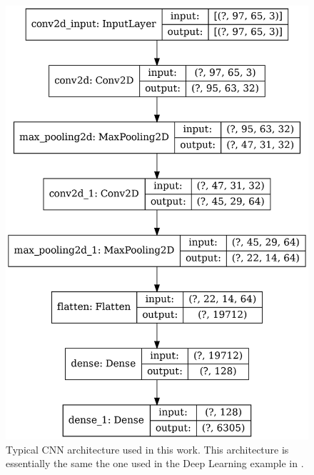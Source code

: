 \documentclass[12pt]{article}
\begin{document}
\begin{figure}[h] 
   \centering
    \includegraphics[totalheight=9cm]{Figures/typical_cnn.png}
    \caption{\label{fig:typical_cnn}Typical CNN architecture used in this work. This architecture is essentially the same the one used in the Deep Learning example in \cite{misc:udemy}.}
\end{figure}
%
%
\end{document}
